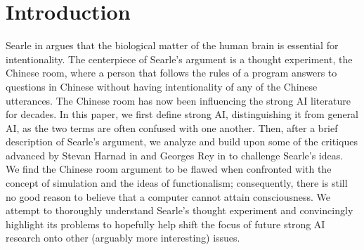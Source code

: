 \section{Introduction}

Searle in \cite{searle1980minds} argues that the biological matter of the human brain is essential for intentionality. The centerpiece of Searle's argument is a thought experiment, the Chinese room, where a person that follows the rules of a program answers to questions in Chinese without having intentionality of any of the Chinese utterances. The Chinese room has now been influencing the strong AI literature for decades. In this paper, we first define strong AI, distinguishing it from general AI, as the two terms are often confused with one another. Then, after a brief description of Searle's argument, we analyze and build upon some of the critiques advanced by Stevan Harnad in \cite{harnad1989minds} and Georges Rey in \cite{rey1986s} to challenge Searle's ideas. We find the Chinese room argument to be flawed when confronted with the concept of simulation and the ideas of functionalism; consequently, there is still no good reason to believe that a computer cannot attain consciousness. We attempt to thoroughly understand Searle's thought experiment and convincingly highlight its problems to hopefully help shift the focus of future strong AI research onto other (arguably more interesting) issues.
